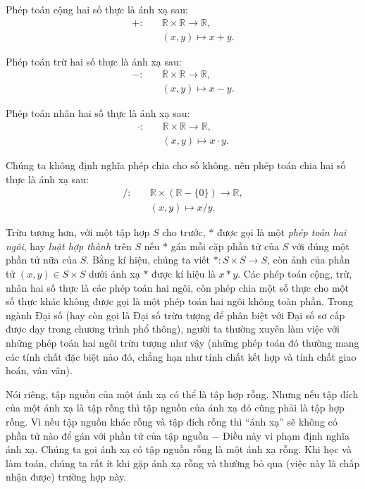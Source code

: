 \begin{example}
    Phép toán cộng hai số thực là ánh xạ sau:
    \begin{align*}
        +:\quad & \mathbb{R}\times\mathbb{R} \to \mathbb{R}, \\
                & (x, y) \mapsto x + y.
    \end{align*}

    Phép toán trừ hai số thực là ánh xạ sau:
    \begin{align*}
        -:\quad & \mathbb{R}\times\mathbb{R} \to \mathbb{R}, \\
                & (x, y) \mapsto x - y.
    \end{align*}

    Phép toán nhân hai số thực là ánh xạ sau:
    \begin{align*}
        \cdot:\quad & \mathbb{R}\times\mathbb{R} \to \mathbb{R}, \\
                    & (x, y) \mapsto x \cdot y.
    \end{align*}

    Chúng ta không định nghĩa phép chia cho số không, nên phép toán chia hai số thực là ánh xạ sau:
    \begin{align*}
        /:\quad & \mathbb{R}\times(\mathbb{R}-\{0\}) \to \mathbb{R}, \\
                & (x, y) \mapsto x/y.
    \end{align*}
\end{example}

Trừu tượng hơn, với một tập hợp $S$ cho trước, $*$ được gọi là một \textit{phép toán hai ngôi}, hay \textit{luật hợp thành} trên $S$ nếu $*$ gán mỗi cặp phần tử của $S$ với đúng một phần tử nữa của $S$. Bằng kí hiệu, chúng ta viết $*: S\times S \to S$, còn ảnh của phần tử $(x, y)\in S\times S$ dưới ánh xạ $*$ được kí hiệu là $x * y$. Các phép toán cộng, trừ, nhân hai số thực là các phép toán hai ngôi, còn phép chia một số thực cho một số thực khác không được gọi là một phép toán hai ngôi không toàn phần. Trong ngành Đại số (hay còn gọi là Đại số trừu tượng để phân biệt với Đại số sơ cấp được dạy trong chương trình phổ thông), người ta thường xuyên làm việc với những phép toán hai ngôi trừu tượng như vậy (những phép toán đó thường mang các tính chất đặc biệt nào đó, chẳng hạn như tính chất kết hợp và tính chất giao hoán, vân vân).

Nói riêng, tập nguồn của một ánh xạ có thể là tập hợp rỗng. Nhưng nếu tập đích của một ánh xạ là tập rỗng thì tập nguồn của ánh xạ đó cũng phải là tập hợp rỗng. Vì nếu tập nguồn khác rỗng và tập đích rỗng thì ``ánh xạ'' sẽ không có phần tử nào để gán với phần tử của tập nguồn $-$ Điều này vi phạm định nghĩa ánh xạ. Chúng ta gọi ánh xạ có tập nguồn rỗng là một ánh xạ rỗng. Khi học và làm toán, chúng ta rất ít khi gặp ánh xạ rỗng và thường bỏ qua (việc này là chấp nhận được) trường hợp này.

